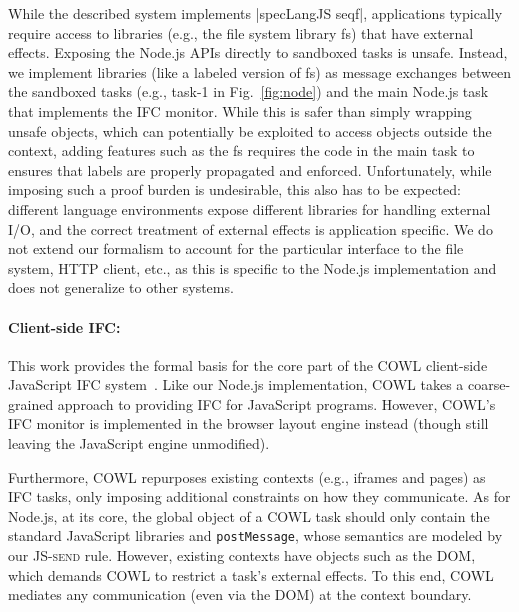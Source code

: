 While the described system implements |specLangJS seqf|, applications
typically require access to libraries (e.g., the file system library
\textsf{fs}) that have external effects.
%
Exposing the Node.js APIs directly to sandboxed tasks is unsafe.
Instead, we implement libraries (like a labeled version of \textsf{fs}) as
message exchanges between the sandboxed tasks (e.g., \textsf{task-1}
in Fig.~\ref{fig:node}) and the main Node.js task that implements
the IFC monitor.
%
While this is safer than simply wrapping unsafe objects, which can
potentially be exploited to access objects outside the context, adding
features such as the \textsf{fs} requires the code in the main task to
ensures that labels are properly propagated and enforced.
%
Unfortunately, while imposing such a proof burden
is undesirable, this also has to be expected:
different language environments expose different libraries for
handling external I/O, and the correct treatment of external effects
is application specific.
%
%
%
We do not extend our formalism to account for the  particular
interface to the file system, HTTP client, etc., as this is
specific to the Node.js implementation and does not generalize
to other systems.


\paragraph{Client-side IFC:}
This work provides the formal basis for the core part of the COWL
client-side JavaScript IFC system~\cite{swapi}.
%
Like our Node.js implementation, COWL takes a coarse-grained approach
to providing IFC for JavaScript programs.
%
However, COWL's IFC monitor is implemented in
the browser layout engine instead (though still leaving the JavaScript engine
unmodified).

Furthermore, COWL repurposes existing contexts (e.g., iframes and
pages) as IFC tasks, only imposing additional constraints on how they
communicate.
%
As for Node.js, at its core, the global object of a COWL task
should only contain the standard JavaScript libraries and
\texttt{postMessage}, whose semantics are modeled by our
\textsc{JS-send} rule.
%
However, existing contexts have objects such as the DOM, which
demands COWL to restrict a task's external effects.
%
To this end, COWL mediates any communication (even via the DOM) at
the context boundary. %

